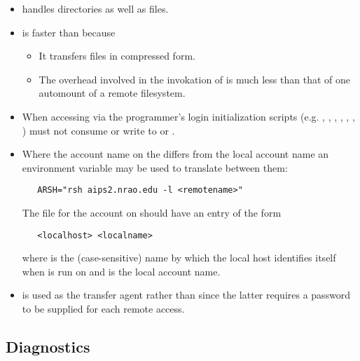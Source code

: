 \begin{itemize}
\item
    handles directories as well as files.
 
\item
    is faster than  because
 
   \begin{itemize}
   \item
      It transfers files in compressed form.
 
   \item
      The overhead involved in the invokation of  is much less
      than that of one automount of a remote filesystem.
   \end{itemize}
 
\item
   When accessing  via  the programmer's
   login initialization scripts (e.g. , ,
   , , , , )
   must not consume  or write to  or .
 
\item
   Where the account name on the  differs from the local
   account name an environment variable may be used to translate between them:
 
\begin{verbatim}
   ARSH="rsh aips2.nrao.edu -l <remotename>"
\end{verbatim}
 
   \noindent
   The  file for the  account on
    should have an entry of the form
 
\begin{verbatim}
   <localhost> <localname>
\end{verbatim}
 
   \noindent
   where  is the (case-sensitive) name by which the local
   host identifies itself when  is run on
    and  is the local account name.
 
\item
    is used as the transfer agent rather than  since
   the latter requires a password to be supplied for each remote access.
\end{itemize}

\subsection*{Diagnostics}
 
